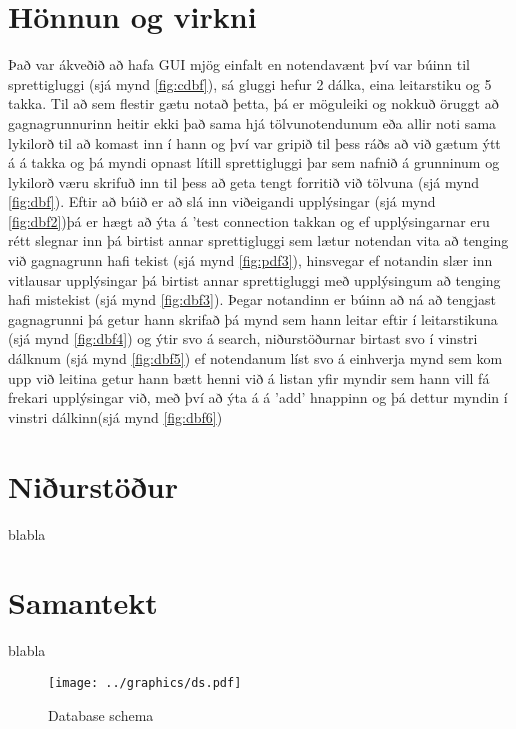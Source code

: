 \documentclass[12pt, git, final]{rureport}
\begin{document}
\section{Hönnun og virkni}
Það var ákveðið að hafa GUI mjög einfalt en notendavænt því var búinn til sprettigluggi (sjá mynd \ref{fig:cdbf}), sá gluggi hefur 2 dálka, eina leitarstiku og 5 takka. Til að sem flestir gætu notað þetta, þá er möguleiki og nokkuð öruggt að gagnagrunnurinn heitir ekki það sama hjá tölvunotendunum eða allir noti sama lykilorð til að komast inn í hann og því var gripið til þess ráðs að við gætum ýtt á á takka og þá myndi opnast lítill sprettigluggi þar sem nafnið á grunninum og lykilorð væru skrifuð inn til þess að geta tengt forritið við tölvuna (sjá mynd \ref{fig:dbf}).
Eftir að búið er að slá inn viðeigandi upplýsingar (sjá mynd \ref{fig:dbf2})þá er hægt að ýta á 'test connection takkan og ef upplýsingarnar eru rétt slegnar inn þá birtist annar sprettigluggi sem lætur notendan vita að tenging við gagnagrunn hafi tekist (sjá mynd \ref{fig:pdf3}), hinsvegar ef notandin slær inn vitlausar upplýsingar þá birtist annar sprettigluggi með upplýsingum að tenging hafi mistekist (sjá mynd \ref {fig:dbf3}).
\newline
\newline
Þegar notandinn er búinn að ná að tengjast gagnagrunni þá getur hann skrifað þá mynd sem hann leitar eftir í leitarstikuna (sjá mynd \ref{fig:dbf4}) og ýtir svo á search, niðurstöðurnar birtast svo í vinstri dálknum (sjá mynd \ref{fig:dbf5}) ef notendanum líst svo á einhverja mynd sem kom upp við leitina  getur hann bætt henni við á listan yfir myndir sem hann vill fá frekari upplýsingar við, með því að ýta á á 'add' hnappinn og þá dettur myndin í vinstri dálkinn(sjá mynd \ref{fig:dbf6})

\section{Niðurstöður}\label{nidurstodur}
blabla


\section{Samantekt}

blabla

\pagebreak
\begin{figure}
	\centering 
	\texttt{[image: ../graphics/ds.pdf]}
	\caption{Database schema \label{fig:dataschema}}
\end{figure}
\end{document}
